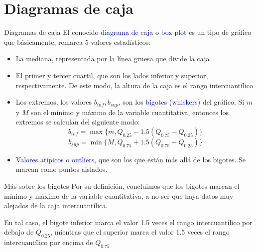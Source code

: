 \documentclass[
  ignorenonframetext,
  aspectratio=169]{beamer}
\providecommand{\tightlist}{%
  \setlength{\itemsep}{0pt}\setlength{\parskip}{0pt}}
\newcommand\blue[1]{\textcolor{blue}{#1}}
\begin{document}
\hypertarget{diagramas-de-caja}{%
\section{Diagramas de caja}\label{diagramas-de-caja}}

\begin{frame}{Diagramas de caja}
\protect\hypertarget{diagramas-de-caja-1}{}
El conocido \blue{diagrama de caja} o \blue{box plot} es un tipo de
gráfico que básicamente, remarca 5 valores estadísticos:

\begin{itemize}
\tightlist
\item
  La mediana, representada por la línea gruesa que divide la caja
\item
  El primer y tercer cuartil, que son los lados inferior y superior,
  respectivamente. De este modo, la altura de la caja es el rango
  intercuantílico
\item
  Los extremos, los valores \(b_{inf},b_{sup}\), son los \blue{bigotes}
  (\blue{whiskers}) del gráfico. Si \(m\) y \(M\) son el mínimo y máximo
  de la variable cuantitativa, entonces los extremos se calculan del
  siguiente modo: \[b_{inf}=\max\{m,Q_{0.25}-1.5(Q_{0.75}-Q_{0.25})\}\]
  \[b_{sup}=\min\{M,Q_{0.75}+1.5(Q_{0.75}-Q_{0.25})\}\]
\item
  \blue{Valores atípicos} o \blue{outliers}, que son los que están más
  allá de los bigotes. Se marcan como puntos aislados.
\end{itemize}
\end{frame}

\begin{frame}{Más sobre los bigotes}
\protect\hypertarget{muxe1s-sobre-los-bigotes}{}
Por su definición, concluimos que los bigotes marcan el mínimo y máximo
de la variable cuantitativa, a no ser que haya datos muy alejados de la
caja intercuantílica.

En tal caso, el bigote inferior marca el valor 1.5 veces el rango
intercuantílico por debajo de \(Q_{0.25}\), mientras que el superior
marca el valor 1.5 veces el rango intercuantílico por encima de
\(Q_{0.75}\)
\end{frame}
\end{document}
